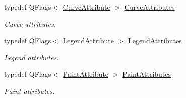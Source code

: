 \begin{DoxyCompactItemize}
typedef Q\-Flags$<$ \hyperlink{class_qwt_plot_curve_a38064f7de6f026a49db782c365f872c3}{Curve\-Attribute} $>$ \hyperlink{class_qwt_plot_curve_a43f465d035a5125d582768944287c70c}{Curve\-Attributes}
\begin{DoxyCompactList}\small\item\em Curve attributes. \end{DoxyCompactList}\item 
typedef Q\-Flags$<$ \hyperlink{class_qwt_plot_curve_a6c1ac1ca99c06598c4044dd2ceeb9fd7}{Legend\-Attribute} $>$ \hyperlink{class_qwt_plot_curve_aa9b27e27ddc27466eed70485e690daa6}{Legend\-Attributes}
\begin{DoxyCompactList}\small\item\em Legend attributes. \end{DoxyCompactList}\item 
typedef Q\-Flags$<$ \hyperlink{class_qwt_plot_curve_a96db1b854c63bfbc452c943251a11b66}{Paint\-Attribute} $>$ \hyperlink{class_qwt_plot_curve_a39ba40485087294c775a367d859b6237}{Paint\-Attributes}
\begin{DoxyCompactList}\small\item\em Paint attributes. \end{DoxyCompactList}\end{DoxyCompactItemize}
